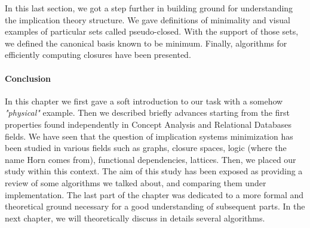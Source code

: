 \vspace{1.2em}


In this last section, we got a step further in building ground for understanding
the implication theory structure. We gave definitions of minimality and visual
examples of particular sets called pseudo-closed. With the support of those
sets, we defined the canonical basis known to be minimum. Finally, algorithms
for efficiently computing closures have been presented. 


\paragraph{Conclusion} In this chapter we first gave a soft introduction to our 
task with a somehow \textit{"physical"} example. Then we described briefly advances starting from the first properties found independently in Concept Analysis and Relational Databases fields. We have seen that the question of implication systems minimization has been studied in various fields such as graphs, closure spaces, logic (where the name Horn comes from), functional dependencies, lattices. Then, we placed our study within this context. The aim of this study has been exposed as providing a review of some algorithms we talked about, and comparing them under implementation. The last part of the chapter was dedicated to a more formal and theoretical ground necessary for a good understanding of subsequent parts. In the next chapter, we will theoretically discuss in details several algorithms.

